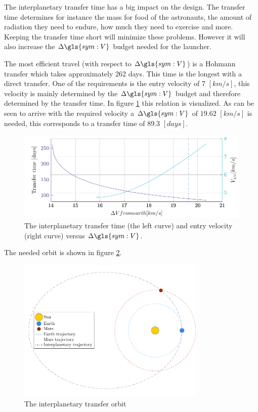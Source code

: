 The interplanetary transfer time has a big impact on the design. The transfer time determines for instance the mass for food of the astronauts, the amount of radiation they need to endure, how much they need to exercise and more. Keeping the transfer time short will minimize these problems. However it will also increase the $\Delta \gls{sym:V}$ budget needed for the launcher. 

The most efficient travel (with respect to $\Delta \gls{sym:V}$) is a Hohmann transfer which takes approximately 262 days. This time is the longest with a direct transfer. One of the requirements is the entry velocity of 7 $\left[km /s\right]$, this velocity is mainly determined by the $\Delta \gls{sym:V}$ budget and therefore determined by the transfer time. In figure \ref{fig:inter_time} this relation is visualized. As can be seen to arrive with the required velocity a $\Delta \gls{sym:V}$ of $19.62$ $\left[km /s\right]$ is needed, this corresponds to a transfer time of 89.3 $\left[days\right]$.

\begin{figure}[h!]
	\centering
	\includegraphics[width=1\textwidth]{Figure/Inter_transfer/transfer_time.pdf}
	\caption{The interplanetary transfer time (the left curve) and entry velocity (right curve) versus $\Delta \gls{sym:V}$.}
	\label{fig:inter_time}
\end{figure}

The needed orbit is shown in figure \ref{fig:inter_orbit}.

\begin{figure}[h!]
	\centering
	\includegraphics[width=0.8\textwidth]{Figure/Inter_transfer/orbits.pdf}
	\caption{The interplanetary transfer orbit}
	\label{fig:inter_orbit}
\end{figure}

